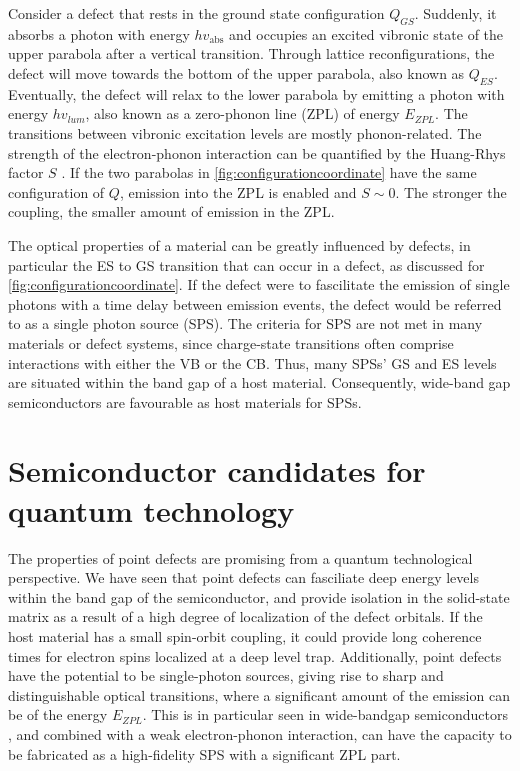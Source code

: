 Consider a defect that rests in the ground state configuration $Q_{GS}$. Suddenly, it absorbs a photon with energy $h v_{\text{abs}}$ and occupies an excited vibronic state of the upper parabola after a vertical transition. Through lattice reconfigurations, the defect will move towards the bottom of the upper parabola, also known as $Q_{ES}$. Eventually, the defect will relax to the lower parabola by emitting a photon with energy $h v_{lum}$, also known as a zero-phonon line (ZPL) of energy $E_{ZPL}$. The transitions between vibronic excitation levels are mostly phonon-related. The strength of the electron-phonon interaction can be quantified by the Huang-Rhys factor $S$ \cite{Huang1950}. If the two parabolas in \autoref{fig:configurationcoordinate} have the same configuration of $Q$, emission into the ZPL is enabled and $S\sim 0$. The stronger the coupling, the smaller amount of emission in the ZPL.

The optical properties of a material can be greatly influenced by defects, in particular the ES to GS transition that can occur in a defect, as discussed for \autoref{fig:configurationcoordinate}. If the defect were to fascilitate the emission of single photons with a time delay between emission events, the defect would be referred to as a single photon source (SPS). The criteria for SPS are not met in many materials or defect systems, since charge-state transitions often comprise interactions with either the VB or the CB. Thus, many SPSs' GS and ES levels are situated within the band gap of a host material. Consequently, wide-band gap semiconductors are favourable as host materials for SPSs.

\section{Semiconductor candidates for quantum technology}

The properties of point defects are promising from a quantum technological perspective. We have seen that point defects can fasciliate deep energy levels within the band gap of the semiconductor, and provide isolation in the solid-state matrix as a result of a high degree of localization of the defect orbitals. If the host material has a small spin-orbit coupling, it could provide long coherence times for electron spins localized at a deep level trap. Additionally, point defects have the potential to be single-photon sources, giving rise to sharp and distinguishable optical transitions, where a significant amount of the emission can be of the energy $E_{ZPL}$. This is in particular seen in wide-bandgap semiconductors \cite{Gordon2013, Weber2010}, and combined with a weak electron-phonon interaction, can have the capacity to be fabricated as a high-fidelity SPS with a significant ZPL part.

